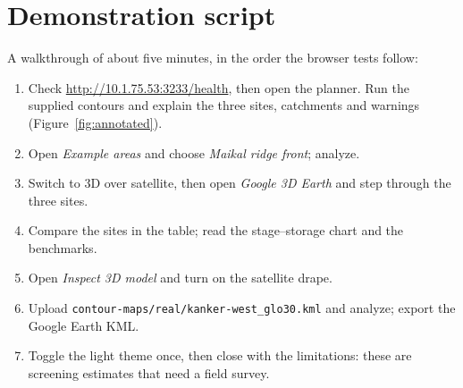\documentclass[11pt,a4paper]{article}
\newcommand{\code}[1]{\texttt{#1}}
\begin{document}
\section{Demonstration script}
\label{app:demo}
A walkthrough of about five minutes, in the order the browser tests follow:
\begin{enumerate}
\item Check \url{http://10.1.75.53:3233/health}, then open the planner. Run the supplied contours and explain the three sites, catchments and warnings (Figure~\ref{fig:annotated}).
\item Open \emph{Example areas} and choose \emph{Maikal ridge front}; analyze.
\item Switch to 3D over satellite, then open \emph{Google 3D Earth} and step through the three sites.
\item Compare the sites in the table; read the stage--storage chart and the benchmarks.
\item Open \emph{Inspect 3D model} and turn on the satellite drape.
\item Upload \code{contour-maps/real/kanker-west\_glo30.kml} and analyze; export the Google Earth KML.
\item Toggle the light theme once, then close with the limitations: these are screening estimates that need a field survey.
\end{enumerate}

\end{document}
